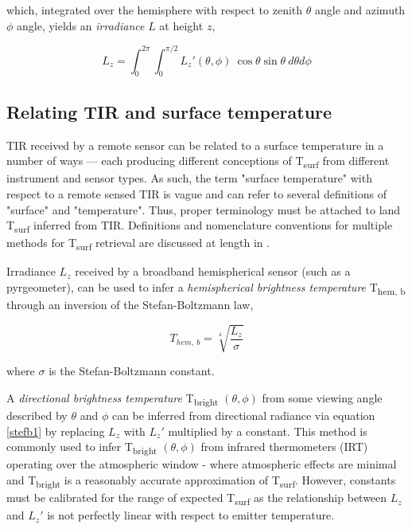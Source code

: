 \begin{bibunit}
\noindent which, integrated over the hemisphere with respect to zenith \(\theta\) angle and azimuth \(\phi\) angle, yields an \textit{irradiance} $ L $ at height $ z $,

\begin{equation}
L_z = \int_{0}^{2\pi} \int_{0}^{\pi/2} L_z'(\theta, \phi) ~ \cos\theta \sin\theta ~ d\theta d\phi
\end{equation}

\subsection{Relating TIR and surface temperature}

TIR received by a remote sensor can be related to a surface temperature in a number of ways --- each producing different conceptions of T\textsubscript{surf} from different instrument and sensor types. As such, the term "surface temperature" with respect to a remote sensed TIR is vague and can refer to several definitions of "surface" and "temperature". Thus, proper terminology must be attached to land T\textsubscript{surf} inferred from TIR. Definitions and nomenclature conventions for multiple methods for T\textsubscript{surf} retrieval are discussed at length in \citet{Norman1995}.

 Irradiance $L_z$ received by a broadband hemispherical sensor (such as a pyrgeometer), can be used to infer a \textit{hemispherical brightness temperature} T\textsubscript{hem, b} through an inversion of the Stefan-Boltzmann law,

\begin{equation}
\label{stefb1}
T_{hem,~ b} = \sqrt[4]{\frac{L_z}{\sigma}}
\end{equation}

\noindent where $ \sigma $ is the Stefan-Boltzmann constant.

A \textit{directional brightness temperature} T\textsubscript{bright} $(\theta, \phi)$ from some viewing angle described by $\theta$ and $\phi$ can be inferred from directional radiance via equation \ref{stefb1} by replacing $ L_z $ with $L_z'$ multiplied by a constant. This method is commonly used to infer T\textsubscript{bright} $(\theta, \phi)$ from infrared thermometers (IRT) operating over the atmospheric window - where atmospheric effects are minimal and T\textsubscript{bright} is a reasonably accurate approximation of T\textsubscript{surf}. However, constants must be calibrated for the range of expected T\textsubscript{surf} as the relationship between $ L_z $ and $L_z'$  is not perfectly linear with respect to emitter temperature.


\end{bibunit}
